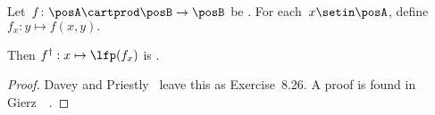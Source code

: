 \begin{lemma}
    \label{lem:dagger}
    Let~$f\colon\posA\cartprod\posB\to\posB$ be \scottcontinuous.
    For each~$x\setin\posA$, define $f_{x}:y\mapsto f(x,y).
    $

    Then $f^{\dagger}:x\mapsto\lfp(f_{x})$ is \scottcontinuous.
\end{lemma}
\begin{proof}
    Davey and Priestly~\cite{davey02} leave this as Exercise~8.26.
    A proof is found in Gierz~\etal~\cite[Exercise II-2.29]{gierz03continuous}.
\end{proof}

